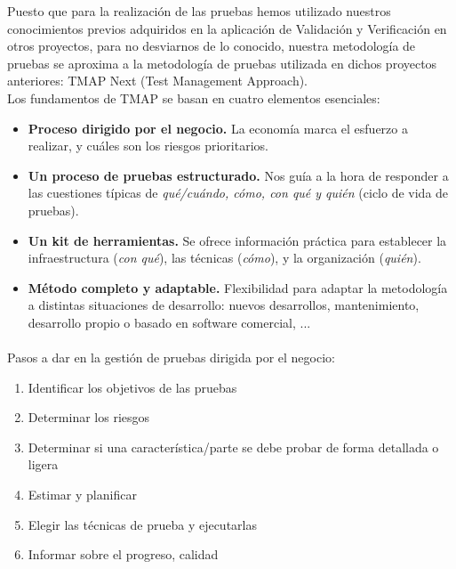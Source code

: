 Puesto que para la realización de las pruebas hemos utilizado nuestros conocimientos previos adquiridos en la aplicación de Validación y Verificación en otros proyectos, para no desviarnos de lo conocido, nuestra metodología de pruebas se aproxima a la metodología de pruebas utilizada en dichos proyectos anteriores: TMAP Next (Test Management Approach).
\\[6pt]
Los fundamentos de TMAP se basan en cuatro elementos esenciales:
\begin{itemize}
	\item \textbf{Proceso dirigido por el negocio.} La economía marca el esfuerzo a realizar, y cuáles son los riesgos prioritarios.
	\item \textbf{Un proceso de pruebas estructurado.} Nos guía a la hora de responder a las cuestiones típicas de \textit{qué/cuándo, cómo, con qué y quién} (ciclo de vida de pruebas).
	\item \textbf{Un kit de herramientas.} Se ofrece información práctica para establecer la infraestructura (\textit{con qué}), las técnicas (\textit{cómo}), y la organización (\textit{quién}).
	\item \textbf{Método completo y adaptable.} Flexibilidad para adaptar la metodología a distintas situaciones de desarrollo: nuevos desarrollos, mantenimiento, desarrollo propio o basado en software comercial, ...
\end{itemize}
\paragraph{} Pasos a dar en la gestión de pruebas dirigida por el negocio:
\begin{enumerate} 
	\item Identificar los objetivos de las pruebas
	\item Determinar los riesgos
	\item Determinar si una característica/parte se debe probar de forma detallada o ligera
	\item Estimar y planificar
	\item Elegir las técnicas de prueba y ejecutarlas 
	\item Informar sobre el progreso, calidad
\end{enumerate}
